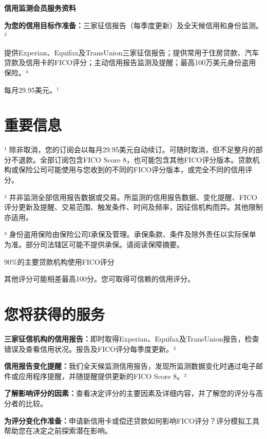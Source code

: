 \documentclass[UTF8,fontset=none,11pt,a4paper]{ctexart}
\begin{document}
{\noindent\fontsize{20}{25}\selectfont\bfseries 信用监测会员服务资料\par}
\vspace{10pt}
\textbf{为您的信用目标作准备：}三家征信报告（每季度更新）及全天候信用和身份监测。²


提供Experian、Equifax及TransUnion三家征信报告；提供常用于住房贷款、汽车贷款及信用卡的FICO评分；主动信用报告监测及提醒；最高100万美元身份盗用保险。³


每月29.95美元。¹


\section*{重要信息}
¹ 除非取消，您的订阅会以每月29.95美元自动续订。可随时取消，但不足整月的部分不退款。全部订阅包含FICO Score 8，也可能包含其他FICO评分版本。贷款机构或保险公司可能使用与您收到的不同的FICO评分版本，或完全不同的\allowbreak\mbox{信用评分。}


² 并非监测全部信用报告数据或交易。所监测的信用报告数据、变化提醒、FICO评分更新及提醒、交易范围、触发条件、时间及频率，因征信机构而异。其他限\allowbreak\mbox{制亦适用。}


³ 身份盗用保险由保险公司I承保及管理。承保条款、条件及除外责任以实际保单为准。部分司法辖区可能不提供承保。请阅读\allowbreak\mbox{保障摘要。}


90\%的主要贷款机构使用FICO评分


其他评分可能相差最高100分。您可取得可信赖的\allowbreak\mbox{信用评分。}


\section*{您将获得的服务}
\textbf{三家征信机构的信用报告：}即时取得Experian、Equifax及TransUnion报告，检查错误及查看信用状况。报告及FICO评分每季度更新。²


\textbf{信用报告变化提醒：}我们全天候监测信用报告，发现所监测数据变化时通过电子邮件或应用程序提醒，并随提醒提供更新的FICO Score 8。²


\textbf{了解影响评分的因素：}查看决定评分的主要因素及详细内容，并了解您的评分与高分\allowbreak\mbox{者的比较。}


\textbf{为评分变化作准备：}申请新信用卡或偿还贷款如何影响FICO评分？评分模拟工具帮助您在决定之前探索\allowbreak\mbox{潜在影响。}
\end{document}
